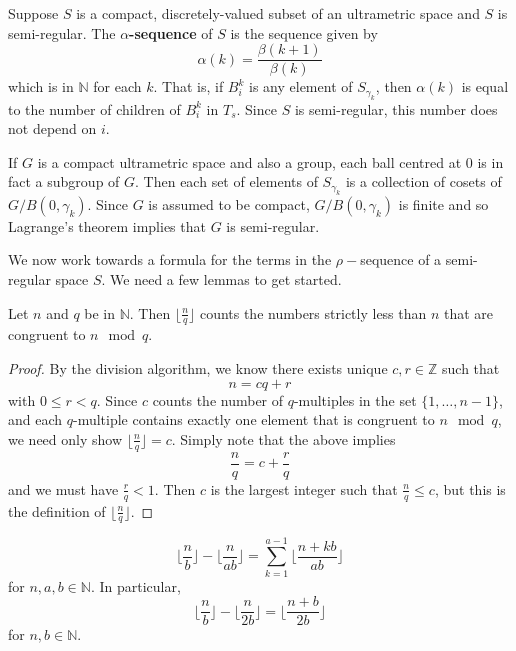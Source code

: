 \begin{definition}
Suppose $S$ is a compact, discretely-valued subset of an ultrametric space and $S$ is semi-regular. The \textbf{$\alpha$-sequence} of $S$ is the sequence given by \[\alpha(k)=\frac{\beta(k+1)}{\beta(k)}\] which is in $\mathbb{N}$ for each $k$. That is, if $B^k_i$ is any element of $S_{\gamma_k}$, then $\alpha(k)$ is equal to the number of children of $B^k_i$ in $T_s$. Since $S$ is semi-regular, this number does not depend on $i$.
\end{definition}

\begin{example}
\label{lagrange}	
	If $G$ is a compact ultrametric space and also a group, each ball centred at $0$ is in fact a subgroup of $G$. Then each set of elements of $S_{\gamma_k}$ is a collection of cosets of $G/B(0,\gamma_k)$. Since $G$ is assumed to be compact, $G/B(0,\gamma_k)$ is finite and so Lagrange's theorem implies that $G$ is semi-regular.
\end{example}

We now work towards a formula for the terms in the $\rho-$sequence of a semi-regular space $S$. We need a few lemmas to get started.\\
 
\begin{lemma}
Let $n$ and $q$ be in $\mathbb{N}$. Then $\lfloor\frac{n}{q} \rfloor$ counts the numbers strictly less than $n$ that are congruent to $n \mod q$.
\end{lemma}

\begin{proof}
By the division algorithm, we know there exists unique $c,r \in \mathbb{Z}$ such that \[n = cq + r\] with $0 \leq r < q$. Since $c$ counts the number of $q$-multiples in the set $\{1,\ldots,n-1\}$, and each $q$-multiple contains exactly one element that is congruent to $n \mod q$, we need only show $\lfloor\frac{n}{q} \rfloor = c$. Simply note that the above implies  \[\frac{n}{q} = c + \frac{r}{q}\] and we must have   $\frac{r}{q} < 1$. Then $c$ is the largest integer such that $\frac{n}{q} \leq c$, but this is the definition of $\lfloor\frac{n}{q} \rfloor$.
\end{proof}


\begin{lemma}
\label{semi-regular formula}
\[\lfloor\frac{n}{b} \rfloor - \lfloor \frac{n}{ab} \rfloor = \sum_{k=1}^{a-1} \lfloor \frac{n + kb}{ab} \rfloor\] for $n,a,b \in \mathbb{N}$. In particular, 
\[\lfloor\frac{n}{b} \rfloor - \lfloor \frac{n}{2b} \rfloor= \lfloor \frac{n+b}{2b} \rfloor\] for  $n,b \in \mathbb{N}$.
\end{lemma}

